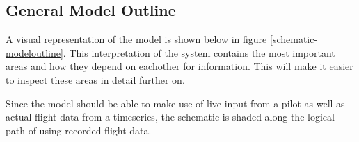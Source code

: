 \subsection{General Model Outline}

A visual representation of the model is shown below in figure \ref{schematic-modeloutline}. This interpretation of the system contains the most important areas and how they depend on eachother for information. This will make it easier to inspect these areas in detail further on.
\label{schematic-modeloutline}


Since the model should be able to make use of live input from a pilot as well as actual flight data from a timeseries, the schematic is shaded along the logical path of using recorded flight data.

\subsubsection{}

